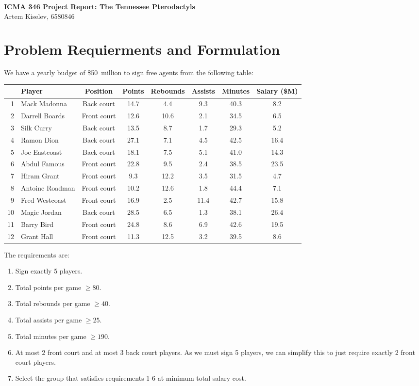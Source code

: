 \documentclass[a4paper,11pt]{article}
\begin{document}
{\Large \textbf{ICMA 346 Project Report: The Tennessee Pterodactyls}}\\
{\normalsize Artem Kiselev, 6580846}

\section*{Problem Requierments and Formulation}
We have a yearly budget of \$50~million to sign free agents from the following table:

\begin{table}[htbp]
\centering
\renewcommand{\arraystretch}{1}
\begin{tabular}{rlcccccc}
\hline
& \textbf{Player} & \textbf{Position} & \textbf{Points} & \textbf{Rebounds} & \textbf{Assists} & \textbf{Minutes} & \textbf{Salary (\$M)} \\
\hline
1  & Mack Madonna        & Back court  & 14.7 & 4.4  & 9.3 & 40.3 & 8.2  \\
2  & Darrell Boards      & Front court & 12.6 & 10.6 & 2.1 & 34.5 & 6.5  \\
3  & Silk Curry          & Back court  & 13.5 & 8.7  & 1.7 & 29.3 & 5.2  \\
4  & Ramon Dion          & Back court  & 27.1 & 7.1  & 4.5 & 42.5 & 16.4 \\
5  & Joe Eastcoast       & Back court  & 18.1 & 7.5  & 5.1 & 41.0 & 14.3 \\
6  & Abdul Famous        & Front court & 22.8 & 9.5  & 2.4 & 38.5 & 23.5 \\
7  & Hiram Grant         & Front court & 9.3  & 12.2 & 3.5 & 31.5 & 4.7  \\
8  & Antoine Roadman     & Front court & 10.2 & 12.6 & 1.8 & 44.4 & 7.1  \\
9  & Fred Westcoast      & Front court & 16.9 & 2.5  & 11.4 & 42.7 & 15.8 \\
10 & Magic Jordan        & Back court  & 28.5 & 6.5  & 1.3 & 38.1 & 26.4 \\
11 & Barry Bird          & Front court & 24.8 & 8.6  & 6.9 & 42.6 & 19.5 \\
12 & Grant Hall          & Front court & 11.3 & 12.5 & 3.2 & 39.5 & 8.6  \\
\hline
\end{tabular}
\end{table}

\vspace{-0.5em}
The requirements are:
\begin{enumerate}
  \item Sign exactly 5 players.
  \item Total points per game $\ge80$.
  \item Total rebounds per game $\ge40$.
  \item Total assists per game $\ge25$.
  \item Total minutes per game $\ge190$.
  \item At most 2 front court and at most 3 back court players. As we must sign 5 players, we can simplify this to just require exactly 2 front court players.
  \item Select the group that satisfies requirements 1-6 at minimum total salary cost.
\end{enumerate}
\end{document}
